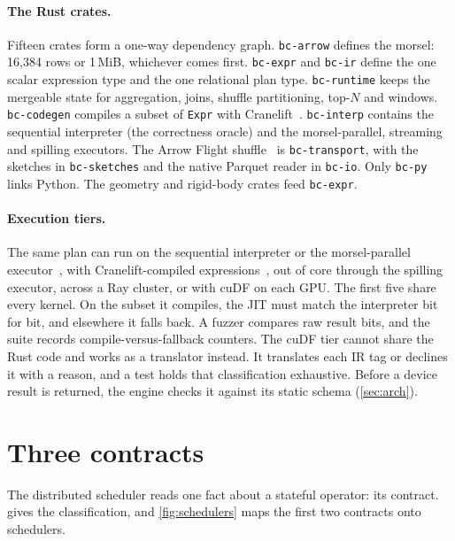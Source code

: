 \documentclass[10pt,twocolumn,letterpaper]{article}   %
\begin{document}
\paragraph{The Rust crates.} Fifteen crates form a one-way dependency graph.
\texttt{bc-arrow} defines the morsel: 16{,}384 rows or 1\,MiB, whichever comes first.
\texttt{bc-expr} and \texttt{bc-ir} define the one scalar expression type and the one
relational plan type. \texttt{bc-runtime} keeps the mergeable state for aggregation, joins,
shuffle partitioning, top-$N$ and windows. \texttt{bc-codegen} compiles a subset of
\texttt{Expr} with Cranelift~\cite{cranelift}. \texttt{bc-interp} contains the sequential
interpreter (the correctness oracle) and the morsel-parallel, streaming and spilling
executors. The Arrow Flight shuffle~\cite{arrowflight} is \texttt{bc-transport}, with the sketches
in \texttt{bc-sketches} and the native Parquet reader in \texttt{bc-io}. Only
\texttt{bc-py} links Python. The geometry and rigid-body crates feed \texttt{bc-expr}.

\paragraph{Execution tiers.} The same plan can run on the sequential interpreter or the
morsel-parallel executor~\cite{leis2014morsel}, with Cranelift-compiled
expressions~\cite{neumann2011compiling}, out of core through the spilling executor, across a
Ray cluster, or with cuDF on each GPU. The first five share every kernel. On the subset it
compiles, the JIT must match the interpreter bit for bit, and elsewhere it falls back. A fuzzer
compares raw result bits, and the suite records compile-versus-fallback counters. The cuDF
tier cannot share the Rust code and works as a translator instead. It translates each IR tag
or declines it with a reason, and a test holds that classification exhaustive. Before a device
result is returned, the engine checks it against its static schema (\cref{sec:arch}).

\section{Three contracts}
\label{sec:algebra}

The distributed scheduler reads one fact about a stateful operator: its contract.
 gives the classification, and \cref{fig:schedulers} maps the first two
contracts onto schedulers.
\end{document}
